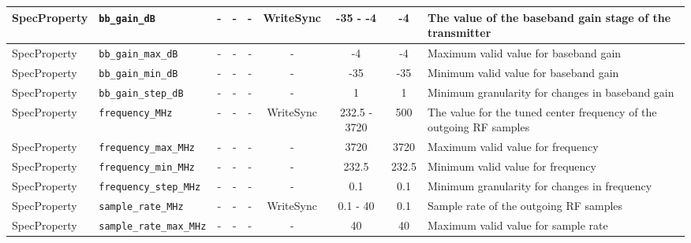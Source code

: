 \documentclass{article}
\begin{document}
\begin{landscape}
\begin{scriptsize}
\begin{tabular}{|p{2cm}|p{4cm}|c|c|c|c|c|c|p{6.5cm}|}
			\hline
			SpecProperty & \verb+bb_gain_dB+                   & -    & -        & -          & WriteSync      & -35 - -4     & -4      & The value of the baseband gain stage of the transmitter                                       \\
			\hline
			SpecProperty & \verb+bb_gain_max_dB+               & -    & -        & -          & -              & -4           & -4      & Maximum valid value for baseband gain                                                         \\
			\hline
			SpecProperty & \verb+bb_gain_min_dB+               & -    & -        & -          & -              & -35          & -35     & Minimum valid value for baseband gain                                                         \\
			\hline
			SpecProperty & \verb+bb_gain_step_dB+              & -    & -        & -          & -              & 1            & 1       & Minimum granularity for changes in baseband gain                                              \\
			\hline
			SpecProperty & \verb+frequency_MHz+                & -    & -        & -          & WriteSync      & 232.5 - 3720 & 500     & The value for the tuned center frequency of the outgoing RF samples                           \\
			\hline
			SpecProperty & \verb+frequency_max_MHz+            & -    & -        & -          & -              & 3720         & 3720    & Maximum valid value for frequency                                                             \\
			\hline
			SpecProperty & \verb+frequency_min_MHz+            & -    & -        & -          & -              & 232.5        & 232.5   & Minimum valid value for frequency                                                             \\
			\hline
			SpecProperty & \verb+frequency_step_MHz+           & -    & -        & -          & -              & 0.1          & 0.1     & Minimum granularity for changes in frequency                                                  \\
			\hline
			SpecProperty & \verb+sample_rate_MHz+              & -    & -        & -          & WriteSync      & 0.1 - 40     & 0.1     & Sample rate of the outgoing RF samples                                                        \\
			\hline
			SpecProperty & \verb+sample_rate_max_MHz+          & -    & -        & -          & -              & 40           & 40      & Maximum valid value for sample rate                                                           \\

\end{tabular}
\end{scriptsize}
\end{landscape}
\end{document}
